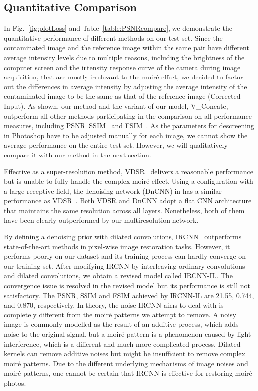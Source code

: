 \documentclass[journal]{IEEEtran}
\begin{document}
\subsection{Quantitative Comparison}
In Fig.~\ref{fig:plotLoss} and Table~\ref{table:PSNRcompare}, we demonstrate the quantitative performance of different methods on our test set. Since the contaminated image and the reference image within the same pair have different average intensity levels due to multiple reasons, including the brightness of the computer screen and the intensity response curve of the camera during image acquisition, that are mostly irrelevant to the moir\'{e} effect, we decided to factor out the differences in average intensity by adjusting the average intensity of the contaminated image to be the same as that of the reference image (Corrected Input). As shown, our method and the variant of our model, V\_Concate, outperform all other methods participating in the comparison on all performance measures, including PSNR, SSIM~\cite{ssim} and FSIM~\cite{fsim}.
As the parameters for descreening in Photoshop have to be adjusted manually for each image, we cannot show the average performance on the entire test set. However, we will qualitatively compare it with our method in the next section.

Effective as a super-resolution method, VDSR~\cite{kim2016accurate} delivers a reasonable performance but is unable to fully handle the complex moir\'{e} effect. Using a configuration with a large receptive field, the denoising network (DnCNN) in \cite{zhang2017beyond} has a similar performance as VDSR~\cite{kim2016accurate}. Both VDSR and DnCNN adopt a flat CNN architecture that maintains the same resolution across all layers. Nonetheless, both of them have been clearly outperformed by our multiresolution network.

By defining a denoising prior with dilated convolutions, IRCNN~\cite{zhang2017learning} outperforms state-of-the-art methods in pixel-wise image restoration tasks. However, it performs poorly on our dataset and its training process can hardly converge on our training set. After modifying IRCNN by interleaving ordinary convolutions and dilated convolutions, we obtain a revised model called IRCNN-IL. The convergence issue is resolved in the revised model but its performance is still not satisfactory. The PSNR, SSIM and FSIM achieved by IRCNN-IL are 21.55, 0.744, and 0.870, respectively.
In theory, the noise IRCNN aims to deal with is completely different from the moir\'{e} patterns we attempt to remove. A noisy image is commonly modelled as the result of an additive process, which adds noise to the original signal, but a moir\'{e} pattern is a phenomenon caused by light interference, which is a different and much more complicated process. Dilated kernels can remove additive noises but might be insufficient to remove complex moir\'{e} patterns. Due to the different underlying mechanisms of image noises and  moir\'{e} patterns, one cannot be certain that IRCNN is effective for restoring moir\'{e} photos.
\end{document}
